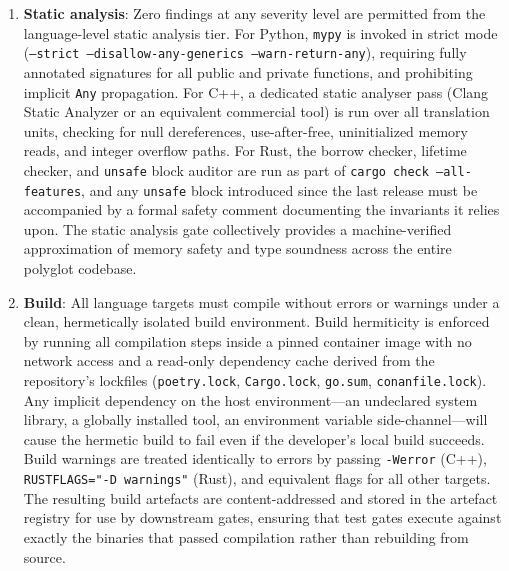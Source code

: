 \documentclass[12pt,openany]{book}
\numberwithin{equation}{chapter}
\theoremstyle{plain}
\theoremstyle{definition}
\theoremstyle{remark}
\begin{document}
\begin{enumerate}
    \item \textbf{Static analysis}: Zero findings at any severity level are permitted
          from the language-level static analysis tier. For Python, \texttt{mypy} is
          invoked in strict mode (\texttt{--strict --disallow-any-generics
          --warn-return-any}), requiring fully annotated signatures for all public and
          private functions, and prohibiting implicit \texttt{Any} propagation. For
          C++, a dedicated static analyser pass (Clang Static Analyzer or an equivalent
          commercial tool) is run over all translation units, checking for null
          dereferences, use-after-free, uninitialized memory reads, and integer overflow
          paths. For Rust, the borrow checker, lifetime checker, and \texttt{unsafe}
          block auditor are run as part of \texttt{cargo check --all-features}, and any
          \texttt{unsafe} block introduced since the last release must be accompanied by
          a formal safety comment documenting the invariants it relies upon. The static
          analysis gate collectively provides a machine-verified approximation of
          memory safety and type soundness across the entire polyglot codebase.

    \item \textbf{Build}: All language targets must compile without errors or warnings
          under a clean, hermetically isolated build environment. Build hermiticity is
          enforced by running all compilation steps inside a pinned container image with
          no network access and a read-only dependency cache derived from the repository's
          lockfiles (\texttt{poetry.lock}, \texttt{Cargo.lock}, \texttt{go.sum},
          \texttt{conanfile.lock}). Any implicit dependency on the host environment—an
          undeclared system library, a globally installed tool, an environment variable
          side-channel—will cause the hermetic build to fail even if the developer's
          local build succeeds. Build warnings are treated identically to errors by
          passing \texttt{-Werror} (C++), \texttt{RUSTFLAGS="-D warnings"} (Rust), and
          equivalent flags for all other targets. The resulting build artefacts are
          content-addressed and stored in the artefact registry for use by downstream
          gates, ensuring that test gates execute against exactly the binaries that
          passed compilation rather than rebuilding from source.


\end{enumerate}
\end{document}
